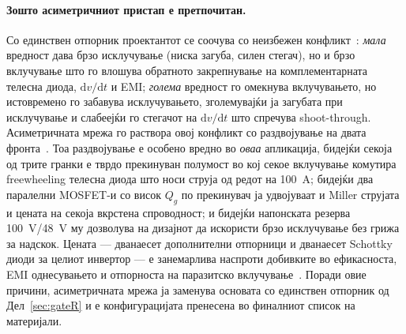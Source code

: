 \documentclass[journal,onecolumn,11pt]{IEEEtran}
\begin{document}
\paragraph{Зошто асиметричниот пристап е претпочитан.} Со единствен отпорник
проектантот се соочува со неизбежен конфликт~\cite{pmeg4030er,nexperia_gdfund}:
\emph{мала} вредност дава брзо исклучување (ниска загуба, силен стегач), но и брзо
вклучување што го влошува обратното закрепнување на комплементарната телесна диода,
$\mathrm{d}v/\mathrm{d}t$ и EMI; \emph{голема} вредност го омекнува вклучувањето, но
истовремено го забавува исклучувањето, зголемувајќи ја загубата при исклучување и
слабеејќи го стегачот на $\mathrm{d}v/\mathrm{d}t$ што спречува shoot-through.
Асиметричната мрежа го раствора овој конфликт со раздвојување на двата
фронта~\cite{pmeg4030er}. Тоа раздвојување е особено вредно во \emph{оваа}
апликација, бидејќи секоја од трите гранки е тврдо прекинуван полумост во кој секое
вклучување комутира freewheeling телесна диода што носи струја од редот на
\SI{100}{\ampere}; бидејќи два паралелни MOSFET-и со висок $Q_g$ по прекинувач ја
удвојуваат и Miller струјата и цената на секоја вкрстена спроводност; и бидејќи
напонската резерва \SI{100}{\volt}/\SI{48}{\volt} му дозволува на дизајнот да
искористи брзо исклучување без грижа за надскок. Цената --- дванаесет дополнителни
отпорници и дванаесет Schottky диоди за целиот инвертор --- е занемарлива наспроти
добивките во ефикасноста, EMI однесувањето и отпорноста на паразитско
вклучување~\cite{pmeg4030er,nexperia_gdfund,toshiba_dvdt}. Поради овие причини,
асиметричната мрежа ја заменува основата со единствен отпорник од Дел~\ref{sec:gateR}
и е конфигурацијата пренесена во финалниот список на материјали.
\end{document}
